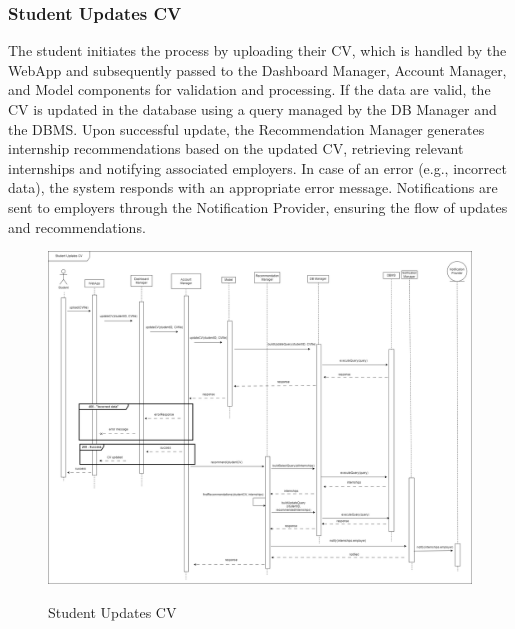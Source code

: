 \documentclass[a4paper,12pt]{article}
\begin{document}
\subsubsection*{Student Updates CV}
The student initiates the process by uploading their CV, which is handled by the WebApp and subsequently passed to the Dashboard Manager, Account Manager, and Model components for validation and processing. If the data are valid, the CV is updated in the database using a query managed by the DB Manager and the DBMS. Upon successful update, the Recommendation Manager generates internship recommendations based on the updated CV, retrieving relevant internships and notifying associated employers. In case of an error (e.g., incorrect data), the system responds with an appropriate error message. Notifications are sent to employers through the Notification Provider, ensuring the flow of updates and recommendations.
\begin{figure}[H]
\centering
\includegraphics[scale = 0.28]{DD_figures/RuntimeView/StudentUpdatesCV_RV.drawio.png}\\
\caption{Student Updates CV}
\end{figure}

\newpage
\end{document}
